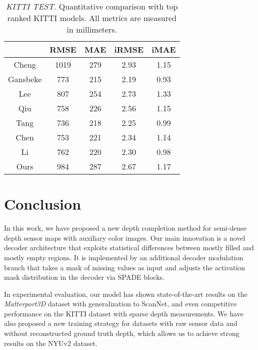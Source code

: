 \documentclass[final]{cvpr}
\begin{document}
    \begin{table}[h]
    \setlength{\tabcolsep}{7pt}
    \renewcommand{\arraystretch}{1.0}
    \centering
    	\begin{tabular}{|c|c|c|c|c|} 
    	    \hline
    		 & RMSE & MAE & iRMSE & iMAE \\
    		\hline
    		\hline
    		Cheng \etal \cite{Cheng_2018_ECCV} & 1019 & 279 & 2.93 & 1.15  \\
    		Gansbeke \cite{wvangansbeke_depth_2019} & 773 & 215 & 2.19 & 0.93 \\
    		Lee \etal \cite{9078070} & 807 & 254 & 2.73 & 1.33 \\
    		Qiu \etal \cite{deeplidar} & 758 & 226 & 2.56 & 1.15 \\
    		Tang \etal \cite{guidenet} & 736 & 218 & 2.25 & 0.99 \\
    		Chen \etal \cite{uberfusenet}& 753 & 221 & 2.34 & 1.14 \\
    		Li \etal \cite{msg_chn} & 762 & 220 & 2.30 & 0.98 \\
    		\hline
    		Ours & 984 & 287 & 2.67 & 1.17 \\
            \hline
    	\end{tabular}
    	\vspace{0.1cm}
    	\caption{\emph{KITTI TEST}. Quantitative comparison with top ranked KITTI models. All metrics are measured in millimeters.}
    	\label{tab:kitti_test}
    \end{table}
    

\section{Conclusion}\label{sec:concl}

In this work, we have proposed a new depth completion method for semi-dense depth sensor maps with auxiliary color images. Our main innovation is a novel decoder architecture that exploits statistical differences between mostly filled and mostly empty regions. It is implemented by an additional decoder modulation branch that takes a mask of missing values as input and adjusts the activation mask distribution in the decoder via SPADE blocks.

In experimental evaluation, our model has shown state-of-the-art results on the \emph{Matterport3D} dataset with generalization to ScanNet, and even competitive performance on the KITTI dataset with sparse depth measurements. We have also proposed a new training strategy for datasets with raw sensor data and without reconstructed ground truth depth, which allows us to achieve strong results on the NYUv2 dataset.
\end{document}
